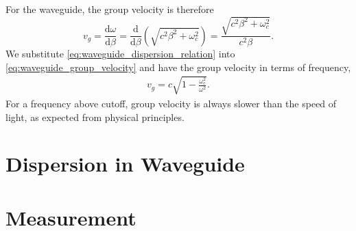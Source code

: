 \documentclass{article}
\newcommand{\dif}{\mathrm{d}}
\begin{document}
For the waveguide, the group velocity is therefore \begin{equation}\label{eq:waveguide_group_velocity}
    v_g = \frac{\dif \omega }{\dif \beta } = \frac{\dif }{\dif \beta}\left( \sqrt{c^2\beta ^2+\omega_c^2} \right) = \frac{\sqrt{c^2\beta^2+\omega_c^2}}{c^2\beta }.
\end{equation}
We substitute \eqref{eq:waveguide_dispersion_relation} into \eqref{eq:waveguide_group_velocity} and have the group velocity in terms of frequency, \begin{align*}
    v_g = c\sqrt{1 - \frac{\omega_c^2}{\omega^2}}.
\end{align*} For a frequency above cutoff, group velocity is always slower than the speed of light, as expected from physical principles.


\section{Dispersion in Waveguide}

\section{Measurement}
\end{document}
